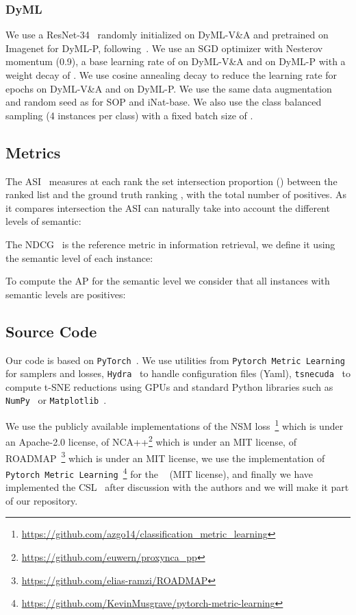 \subsubsection{DyML} We use a ResNet-34~\cite{he2015deep} randomly initialized on DyML-V\&A and pretrained on Imagenet for DyML-P, following~\cite{sun2021dynamic}. We use an SGD optimizer with Nesterov momentum (0.9), a base learning rate of  on DyML-V\&A and  on DyML-P with a weight decay of . We use cosine annealing decay to reduce the learning rate for  epochs on DyML-V\&A and  on DyML-P. We use the same data augmentation and random seed as for SOP and iNat-base. We also use the class balanced sampling (4 instances per class) with a fixed batch size of .


\subsection{Metrics}

The ASI~\cite{fagin2003comparing} measures at each rank  the set intersection proportion () between the ranked list  and the ground truth ranking , with  the total number of positives. As it compares intersection the ASI can naturally take into account the different levels of semantic: 




The NDCG~\cite{croft2010search} is the reference metric in information retrieval, we define it using the semantic level  of each instance:




To compute the AP for the semantic level  we consider that all instances with semantic levels  are positives:


\subsection{Source Code}

Our code is based on \texttt{PyTorch}~\cite{pytorch}. We use utilities from \texttt{Pytorch Metric Learning}~\cite{PML} \eg for samplers and losses, \texttt{Hydra}~\cite{hydra} to handle configuration files (Yaml), \texttt{tsnecuda}~\cite{chan2019gpu} to compute t-SNE reductions using GPUs and standard Python libraries such as \texttt{NumPy}~\cite{harris2020array} or \texttt{Matplotlib}~\cite{matplotlib}.

We use the publicly available implementations of the NSM loss~\cite{zhai2018classification}\footnote{\url{https://github.com/azgo14/classification_metric_learning}} which is under an Apache-2.0 license, of NCA++\cite{teh2020proxynca++}\footnote{\url{https://github.com/euwern/proxynca_pp}} which is under an MIT license, of ROADMAP~\cite{ramzi2021robust}\footnote{\url{https://github.com/elias-ramzi/ROADMAP}} which is under an MIT license, we use the implementation of \texttt{Pytorch Metric Learning}~\cite{PML}\footnote{\url{https://github.com/KevinMusgrave/pytorch-metric-learning}} for the ~\cite{wu2017sampling} (MIT license), and finally we have implemented the CSL~\cite{sun2021dynamic} after discussion with the authors and we will make it part of our repository.


